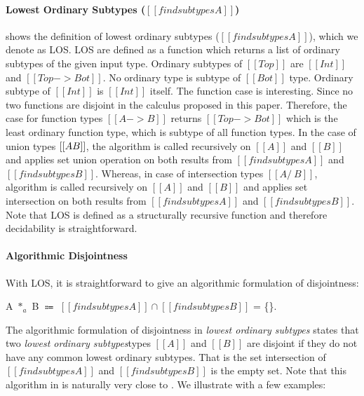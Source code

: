 \paragraph{Lowest Ordinary Subtypes ($[[findsubtypes A]]$)}
 shows the definition of
lowest ordinary subtypes ($[[findsubtypes A]]$), which we denote as LOS.
LOS are defined as a function which
returns a list of ordinary subtypes of the given input type.  Ordinary
subtypes of $[[Top]]$ are $[[Int]]$ and $[[Top -> Bot]]$.
No ordinary type is subtype of $[[Bot]]$ type. Ordinary
subtype of $[[Int]]$ is $[[Int]]$ itself. The function case is
interesting. Since no two functions are disjoint in the calculus
proposed in this paper.
Therefore, the case for function types $[[A -> B]]$ returns $[[Top
    -> Bot]]$ which is the least ordinary function type, which is subtype
of all function types. In the case of union types $[[A \/ B]]$, the
algorithm is called recursively on $[[A]]$ and $[[B]]$ and applies set union
operation on both results from $[[findsubtypes A]]$ and
$[[findsubtypes B]]$. Whereas, in case of intersection types $[[A
    /\ B]]$, algorithm is called recursively on $[[A]]$ and $[[B]]$
and applies set intersection on both results from
$[[findsubtypes A]]$ and $[[findsubtypes B]]$.
Note that LOS is defined as a structurally recursive function and therefore
decidability is straightforward.

\paragraph{Algorithmic Disjointness}
With LOS, it is straightforward to give an algorithmic formulation of
disjointness:

\begin{definition}
\label{def:inter:ad}
  A $*_a$ B $\Coloneqq$  $ [[findsubtypes A]] \cap [[findsubtypes B]] $ = \{\}.
\end{definition}

\noindent The algorithmic formulation of disjointness in
\emph{lowest ordinary subtypes} states that two
\emph{lowest ordinary subtypes}types
$[[A]]$ and $[[B]]$ are disjoint
if they do not have any common lowest ordinary subtypes. That is the
set intersection of $[[findsubtypes A]]$ and $[[findsubtypes B]]$ is the empty set.
Note that this algorithm in  is naturally very close to .
We illustrate  with a few examples:

